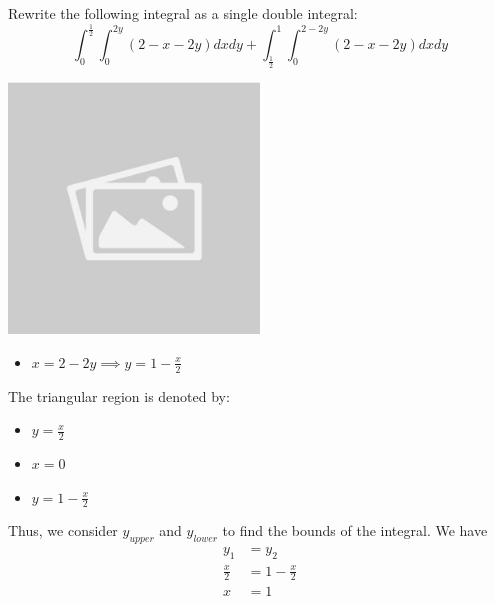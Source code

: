 \documentclass{article}
\begin{document}
\begin{examplebox}
    Rewrite the following integral as a single double integral:
    \[
        \int_{0}^{\frac{1}{2}} \int_{0}^{2y} (2 - x - 2y) dxdy + \int_{\frac{1}{2}}^{1} \int_{0}^{2 - 2y} (2 - x - 2y) dxdy
    \]

    \begin{solutionbox}
        \begin{illustrationbox}
            \begin{center}
                \includegraphics[width=0.5\textwidth]{sample_image.jpg}
            \end{center}
        \end{illustrationbox}
        \begin{itemize}
            \item \( x = 2 - 2y \implies y = 1 - \frac{x}{2} \)
        \end{itemize}
        The triangular region is denoted by:
        \begin{itemize}
            \item \( y = \frac{x}{2} \)
            \item \( x = 0 \)
            \item \( y = 1 - \frac{x}{2} \)
        \end{itemize}

        Thus, we consider \( y_{upper} \) and \( y_{lower} \) to find the bounds of the integral. We have
        \begin{align*}
            y_1 &= y_2 \\
            \frac{x}{2} &= 1 - \frac{x}{2} \\
            x &= 1
        \end{align*}

    \end{solutionbox}
\end{examplebox}
\end{document}
